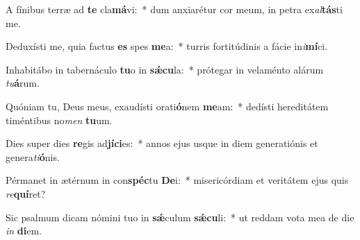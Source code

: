 \item A fínibus terræ ad \textbf{te} cla\textbf{má}vi:~* dum anxiarétur cor meum, in petra ex\textit{al}\textbf{tás}ti me.
\item Deduxísti me, quia factus \textbf{es} spes \textbf{me}a:~* turris fortitúdinis a fácie in\textit{i}\textbf{mí}ci.
\item Inhabitábo in tabernáculo \textbf{tu}o in \textbf{sǽ}\textbf{cu}la:~* prótegar in velaménto alárum \textit{tu}\textbf{á}rum.
\item Quóniam tu, Deus meus, exaudísti orati\textbf{ó}nem \textbf{me}am:~* dedísti hereditátem timéntibus no\textit{men} \textbf{tu}um.
\item Dies super dies \textbf{re}gis ad\textbf{jí}\textbf{ci}es:~* annos ejus usque in diem generatiónis et genera\textit{ti}\textbf{ó}nis.
\item Pérmanet in ætérnum in con\textbf{spéc}tu \textbf{De}i:~* misericórdiam et veritátem ejus quis \textit{re}\textbf{quí}ret?
\item Sic psalmum dicam nómini tuo in \textbf{sǽ}culum \textbf{sǽ}\textbf{cu}li:~* ut reddam vota mea de die \textit{in} \textbf{di}em.
